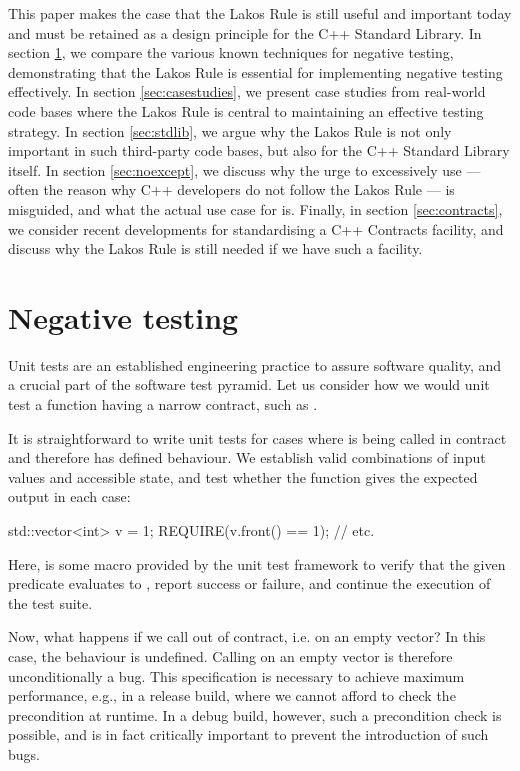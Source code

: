 This paper makes the case that the Lakos Rule is still useful and important today and must be retained as a design principle for the C++ Standard Library. In section \ref{sec:negativetest}, we compare the various known techniques for negative testing, demonstrating that the Lakos Rule is essential for implementing negative testing effectively. In section \ref{sec:casestudies}, we present case studies from real-world code bases where the Lakos Rule is central to maintaining an effective testing strategy. In section \ref{sec:stdlib}, we argue why the Lakos Rule is not only important in such third-party code bases, but also for the C++ Standard Library itself. In section \ref{sec:noexcept}, we discuss why the urge to excessively use  --- often the reason why C++ developers do not follow the Lakos Rule --- is misguided, and what the actual use case for  is. Finally, in section \ref{sec:contracts}, we consider recent developments for standardising a C++ Contracts facility, and discuss why the Lakos Rule is still needed if we have such a facility.

\section{Negative testing}
\label{sec:negativetest}

Unit tests are an established engineering practice to assure software quality, and a crucial part of the software test pyramid. Let us consider how we would unit test a function having a narrow contract, such as .

It is straightforward to write unit tests for cases where  is being called in contract and therefore has defined behaviour. We establish valid combinations of input values and accessible state, and test whether the function gives the expected output in each case:
\begin{codeblock}
std::vector<int> v = {1};
REQUIRE(v.front() == 1);
// etc.
\end{codeblock}
Here,  is some macro provided by the unit test framework to verify that the given predicate evaluates to , report success or failure, and continue the execution of the test suite.

Now, what happens if we call  out of contract, i.e. on an empty vector? In this case, the behaviour is undefined. Calling  on an empty vector is therefore unconditionally a bug. This specification is necessary to achieve maximum performance, e.g., in a release build, where we cannot afford to check the precondition at runtime. In a debug build, however, such a precondition check is possible, and is in fact critically important to prevent the introduction of such bugs.


